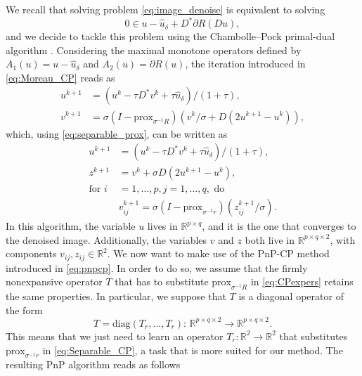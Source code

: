 \documentclass[onefignum,onetabnum]{siamonline250211}
\newcommand{\R}{\mathbb{R}}
\begin{document}
We recall that solving problem \cref{eq:image_denoise} is equivalent to solving 
\begin{equation}\label{eq:monotincldeno}
0\in u-\hat u_\delta + D^*\partial R (D u),
\end{equation}
and we decide to tackle this problem using the Chambolle--Pock primal-dual algorithm \cite{Chambolle2011}. Considering the maximal monotone operators defined by $A_1(u) = u-\hat u_\delta$ and $A_2(u) = \partial R (u)$, the iteration introduced in \cref{eq:Moreau_CP} reads as
\begin{equation}\label{eq:CPexpers}
    \begin{aligned}
    u^{k+1} & = (u^k-\tau D^*v^k+\tau\hat u_\delta)/(1+\tau),\\
    v^{k+1} & = \sigma (I-\text{prox}_{\sigma^{-1} R})\left(v^k/\sigma + D(2u^{k+1}-u^k)\right),
    \end{aligned}
\end{equation}
which, using \cref{eq:separable_prox}, can be written as
\begin{equation}\label{eq:Separable_CP}
    \begin{aligned}
    u^{k+1} & = (u^k-\tau D^*v^k+\tau\hat u_\delta)/(1+\tau),\\
    z^{k+1} & =  v^k+\sigma D(2u^{k+1}-u^k),\\
    \text{for } i & = 1,\dots,p, j=1,\dots,q, \text{ do }\\ 
    & v_{ij}^{k+1}=\sigma(I-\text{prox}_{\sigma^{-1}r})(z_{ij}^{k+1}/\sigma).
    \end{aligned}
\end{equation}
In this algorithm, the variable $u$ lives in $\mathbb{R}^{p\times q}$, and it is the one that converges to the denoised image. Additionally, the variables $v$ and $z$ both live in $\mathbb{R}^{p\times q\times 2}$, with components $v_{ij},z_{ij}\in\mathbb{R}^2$. We now want to make use of the PnP-CP method introduced in \cref{eq:pnpcp}. In order to do so, we assume that the firmly nonexpansive operator $T$ that has to substitute $\text{prox}_{\sigma^{-1} R}$ in \cref{eq:CPexpers} retains the same properties. In particular, we suppose that $T$ is a diagonal operator of the form
\begin{equation}\label{eq:separable_T}
T = \text{diag}(T_r, \dots, T_r) : \, \mathbb{R}^{p\times q \times 2} \to \mathbb{R}^{p\times q \times 2}.
\end{equation}
This means that we just need to learn an operator $T_r: \R^2\to \R^2$ that substitutes $\text{prox}_{\sigma^{-1} r}$ in \cref{eq:Separable_CP}, a task that is more suited for our method. The resulting PnP algorithm reads as follows
\end{document}

